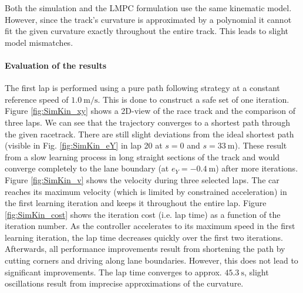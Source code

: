 Both the simulation and the LMPC formulation use the same kinematic model. However, since the track's curvature is approximated by a polynomial it cannot fit the given curvature exactly throughout the entire track. This leads to slight model mismatches.
\paragraph{Evaluation of the results}
The first lap is performed using a pure path following strategy at a constant reference speed of $\SI{1.0}{\meter\per\second}$. This is done to construct a safe set of one iteration.\\
Figure \ref{fig:SimKin_xy} shows a 2D-view of the race track and the comparison of three laps. We can see that the trajectory converges to a shortest path through the given racetrack. There are still slight deviations from the ideal shortest path (visible in Fig. \ref{fig:SimKin_eY} in lap 20 at $s=0$ and $s=\SI{33}{\meter}$). These result from a slow learning process in long straight sections of the track and would converge completely to the lane boundary (at $e_Y=-\SI{0.4}{\meter}$) after more iterations.\\
Figure \ref{fig:SimKin_v} shows the velocity during three selected laps. The car reaches its maximum velocity (which is limited by constrained acceleration) in the first learning iteration and keeps it throughout the entire lap. Figure \ref{fig:SimKin_cost} shows the iteration cost (i.e. lap time) as a function of the iteration number. As the controller accelerates to its maximum speed in the first learning iteration, the lap time decreases quickly over the first two iterations. Afterwards, all performance improvements result from shortening the path by cutting corners and driving along lane boundaries. However, this does not lead to significant improvements. The lap time converges to approx. $\SI{45.3}{\second}$, slight oscillations result from imprecise approximations of the curvature.

